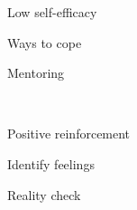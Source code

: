 \documentclass[aspectratio=169]{beamer}
\begin{document}
\begin{frame}
  \begin{center}
    \Huge Low self-efficacy
    \\ \small \cite{feedback}
  \end{center}
\end{frame}



\begin{frame}
  \begin{center}
    \Huge Ways to cope
  \end{center}
\end{frame}

\begin{frame}
  \begin{center}
    \Huge Mentoring

    \\ \small \cite{hh15}
  \end{center}
\end{frame}

\begin{frame}
  \begin{center}
    \Huge Positive reinforcement
    \\ \small \cite{hh15}
  \end{center}
\end{frame}

\begin{frame}
  \begin{center}
    \Huge Identify feelings
    \\ \small \cite{caltech}
  \end{center}
\end{frame}

\begin{frame}
  \begin{center}
    \Huge Reality check
    \\ \small \cite{caltech}
  \end{center}
\end{frame}
\end{document}
